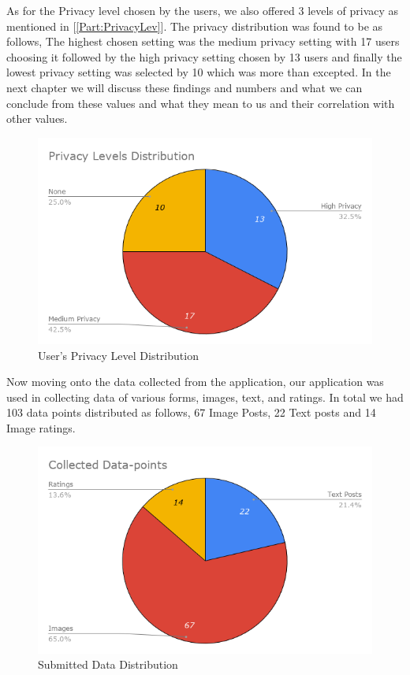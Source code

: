 As for the Privacy level chosen by the users, we also offered 3 levels of privacy as mentioned in [\ref{Part:PrivacyLev}]. The privacy distribution was found to be as follows, The highest chosen setting was the medium privacy setting with 17 users choosing it followed by the high privacy setting chosen by 13 users and finally the lowest privacy setting was selected by 10 which was more than excepted.
In the next chapter we will discuss these findings and numbers and what we can conclude from these values and what they mean to us and their correlation with other values.
\newline
\newline
\begin{figure}[H]
    \centering
    \includegraphics[scale=0.55]{PrivacyChart}
    \caption{User's Privacy Level Distribution}
    \label{fig:PrivacyLevels}
\end{figure}

Now moving onto the data collected from the application, our application was used in collecting data of various forms, images, text, and ratings. In total we had 103 data points distributed as follows, 67 Image Posts, 22 Text posts and 14 Image ratings.
\begin{figure}[H]
    \centering
    \includegraphics[scale=0.55]{Data-points}
    \caption{Submitted Data Distribution}
    \label{fig:DataPoints}
\end{figure}
